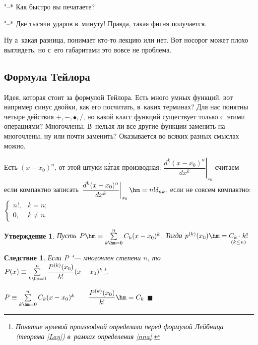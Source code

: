 \documentclass[a4paper,10pt,twoside]{article}
\newtheorem{Sl}{Следствие}[section]
\newtheorem{Ut}{Утверждение}[section]
\newenvironment{Proof}
       {\par\noindent{\textbf{Доказательство.}}}
       {\hfill$\scriptstyle\blacksquare$}
\begin{document}
"--* Как быстро вы печатаете?

"--* Две тысячи ударов в~минуту! Правда, такая фигня получается.

Ну а~какая разница, понимает кто-то лекцию или нет. Вот носорог может плохо выглядеть, но с~его габаритами это вовсе не проблема.

\subsection{Формула Тейлора}

Идея, которая стоит за формулой Тейлора. Есть много умных функций, вот например синус двойки, как его посчитать, в~каких терминах?
Для нас понятны четыре действия $+,-,\bullet,/$, но какой класс функций существует только с~этими операциями? Многочлены. В~нельзя ли все другие функции заменить
на многочлены, ну или почти заменить? Оказывается во всяких разных смыслах можно.

Есть $(x-x_0)^n$, от этой штуки к\'{а}тая производная: $\left.\dfrac{d^k(x-x_0)^n}{dx^k}\right|_{x_0}$ считаем\\
\qquad если компактно записать $\left.\dfrac{d^k(x-x_0)^n}{dx^k}\right|_{x_0}
\hm=n!\delta_{nk}$, если не совсем компактно: $\begin{cases}n!,&k=n;\\0,&k\neq n.\end{cases}$

\begin{Ut}
    Пусть $P\hm=\sum\limits_{k\hm=0}^nC_k(x-x_0)^k$. Тогда $p^{(k)}(x_0)\hm=\underset{(k\leq n)}{C_k\cdot k!}$
\end{Ut}

\begin{Sl}
    Если $P$ "--- многочлен степени $n$, то $P(x)\equiv\sum\limits_{k\hm=0}^n\dfrac{P^{(k)}(x_0)}{k!}(x-x_0)^k$\pau\footnote{Понятие нулевой производной определили перед формулой Лейбница (теорема \ref{Lay}) в~рамках определения \ref{nna}.}.
\end{Sl}

\begin{Proof}
    $P\equiv\sum\limits_{k\hm=0}^nC_k(x-x_0)^k\qquad \dfrac{P^{(k)}(x_0)}{k!}\hm=C_k$
\end{Proof}
\end{document}

